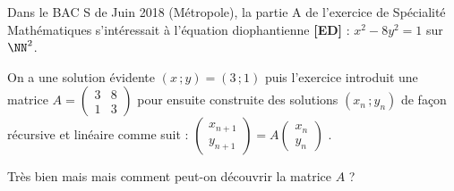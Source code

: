 Dans le BAC S de Juin 2018 (Métropole), la partie A de l'exercice de Spécialité Mathématiques s'intéressait à l'équation diophantienne \textbf{[ED]} : $x^2 - 8 y^2 = 1$ sur $\NN^2$.


\medskip

On a une solution évidente $(x \,; y) = (3 \,; 1)$ puis l'exercice introduit une matrice 
$A =
\begin{pmatrix} 
  3 & 8  \\ 
  1 & 3 
\end{pmatrix}$
pour ensuite construite des solutions $(x_n \,; y_n)$ de façon récursive et linéaire comme suit :
$\begin{pmatrix} 
  x_{n+1} \\ 
  y_{n+1} 
\end{pmatrix}
=
A
\begin{pmatrix} 
  x_{n} \\ 
  y_{n} 
\end{pmatrix}
$ .


\medskip

Très bien mais mais comment peut-on découvrir la matrice  $A$ ?